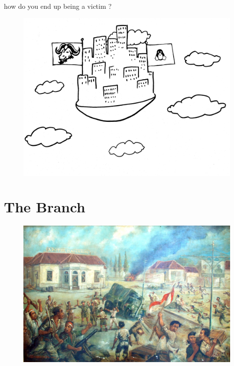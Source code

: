 \documentclass[notes,usenames,dvipsnames]{beamer}       %
\begin{document}
\begin{frame}
  \begin{center}
    \Huge how do you end up being a victim ?
  \end{center}
\end{frame}

\begin{frame}
  \begin{figure}
    \centering
    \includegraphics[scale=0.5]{img/gnu-linux-world}
  \end{figure}
\end{frame}

\section{The Branch}

\begin{frame}
  \begin{figure}
    \centering
    \includegraphics[scale=0.2]{img/ind-war}
  \end{figure}
\end{frame}
\end{document}
